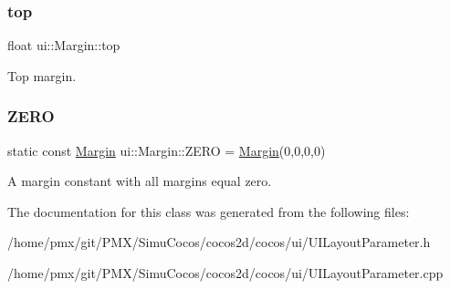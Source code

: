 \subsubsection{\texorpdfstring{top}{top}}
{\footnotesize\ttfamily float ui\+::\+Margin\+::top}

Top margin. \mbox{\label{classui_1_1Margin_ab3ae697c2669c2289ebd39f10a2eadfd}} 
\subsubsection{\texorpdfstring{Z\+E\+RO}{ZERO}}
{\footnotesize\ttfamily static const \hyperlink{classui_1_1Margin}{Margin} ui\+::\+Margin\+::\+Z\+E\+RO = \hyperlink{classui_1_1Margin}{Margin}(0,0,0,0)\hspace{0.3cm}{\ttfamily [static]}}

A margin constant with all margins equal zero. 

The documentation for this class was generated from the following files\+:\begin{DoxyCompactItemize}
\item 
/home/pmx/git/\+P\+M\+X/\+Simu\+Cocos/cocos2d/cocos/ui/U\+I\+Layout\+Parameter.\+h\item 
/home/pmx/git/\+P\+M\+X/\+Simu\+Cocos/cocos2d/cocos/ui/U\+I\+Layout\+Parameter.\+cpp\end{DoxyCompactItemize}
